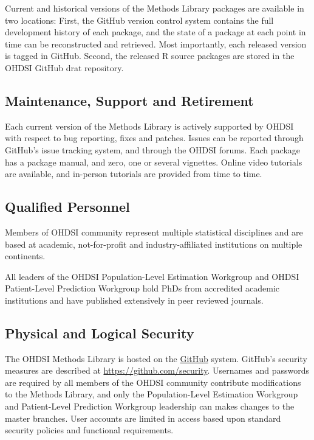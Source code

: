 \documentclass[]{book}
\begin{document}
Current and historical versions of the Methods Library packages are
available in two locations: First, the GitHub version control system
contains the full development history of each package, and the state of
a package at each point in time can be reconstructed and retrieved. Most
importantly, each released version is tagged in GitHub. Second, the
released R source packages are stored in the OHDSI GitHub drat
repository.

\subsection{Maintenance, Support and
Retirement}\label{maintenance-support-and-retirement}

Each current version of the Methods Library is actively supported by
OHDSI with respect to bug reporting, fixes and patches. Issues can be
reported through GitHub's issue tracking system, and through the OHDSI
forums. Each package has a package manual, and zero, one or several
vignettes. Online video tutorials are available, and in-person tutorials
are provided from time to time.

\subsection{Qualified Personnel}\label{qualified-personnel}

Members of OHDSI community represent multiple statistical disciplines
and are based at academic, not-for-profit and industry-affiliated
institutions on multiple continents.

All leaders of the OHDSI Population-Level Estimation Workgroup and OHDSI
Patient-Level Prediction Workgroup hold PhDs from accredited academic
institutions and have published extensively in peer reviewed journals.

\subsection{Physical and Logical
Security}\label{physical-and-logical-security}

The OHDSI Methods Library is hosted on the
\href{https://github.com/}{GitHub} system. GitHub's security measures
are described at \url{https://github.com/security}. Usernames and
passwords are required by all members of the OHDSI community contribute
modifications to the Methods Library, and only the Population-Level
Estimation Workgroup and Patient-Level Prediction Workgroup leadership
can makes changes to the master branches. User accounts are limited in
access based upon standard security policies and functional
requirements.
\end{document}
